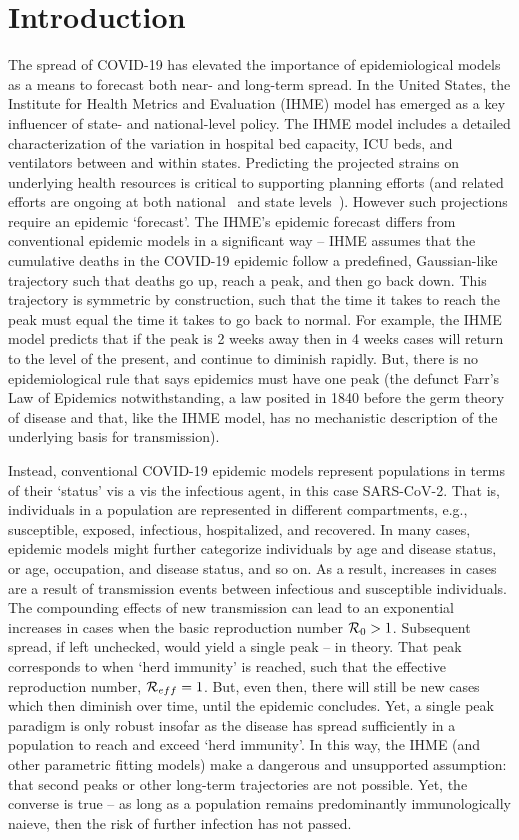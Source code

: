 \section{Introduction}
The spread of COVID-19 has elevated the importance of epidemiological
models as a means to forecast both near- and long-term spread. 
In the United States, the Institute for Health Metrics and Evaluation (IHME)
model has emerged as a key influencer of state- and national-level
policy.  The IHME model includes a detailed characterization
of the variation in
hospital bed capacity, ICU beds, and ventilators between and within
states. Predicting the projected strains on underlying
health resources
 is critical to supporting planning efforts (and related
efforts are ongoing at both national~\citep{meyers} and
state levels~\citep{upenn}).  However such projections require
an epidemic `forecast'.  The IHME's epidemic forecast
differs from conventional
epidemic models in a significant way -- IHME assumes
that the cumulative deaths in the COVID-19 epidemic
follow a predefined, Gaussian-like trajectory 
such that deaths go up, reach a peak,
and then go back down.  This trajectory is symmetric
by construction, such that the time it takes to reach the peak 
must equal the time it takes to go back to normal.  For example, the 
IHME model predicts that if the peak is 2 weeks away then in 4 weeks
cases will return to the level of the present, and continue
to diminish rapidly.  But, there is no epidemiological rule
that says epidemics must have one peak (the defunct
Farr's Law of Epidemics notwithstanding, a law posited in 1840 before the
germ theory of disease and that, like the IHME model, has 
no mechanistic description of the underlying basis for transmission).

Instead, conventional COVID-19 epidemic
models represent populations in terms of their `status' vis
a vis the infectious agent, in this case SARS-CoV-2.  That is, individuals
in a population are represented in different compartments, e.g.,
susceptible, exposed, infectious,
hospitalized, and recovered.  In many cases, epidemic models
might further categorize individuals by age and disease status, or age, occupation,
and disease status, and so on.  As a result, increases in cases
are a result of transmission events between infectious
and susceptible individuals.  The compounding effects 
of new transmission can lead to an exponential increases in cases 
when the basic reproduction number ${\cal{R}}_0>1$.  Subsequent
spread, if left unchecked, would yield a single peak -- in theory. That 
peak corresponds to when `herd immunity' is reached, such
that the effective reproduction number, ${\cal{R}}_{eff}=1$. 
But, even then, there will still be new cases which then
diminish over time, until the epidemic concludes.  
Yet, a single peak paradigm is
only robust insofar as the disease has spread
sufficiently in a population to reach and exceed `herd immunity'.
In this way, the IHME (and other parametric fitting models) make
a dangerous and unsupported assumption: that second peaks
or other long-term trajectories are not possible.  Yet, the converse
is true -- as long as a population remains predominantly immunologically
naieve, then the risk of further infection has not passed. 

